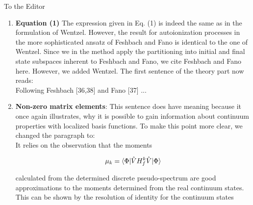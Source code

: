 \documentclass[DIN,pagenumber=false,parskip=half,fromalign=left,fromphone=true,fromemail=true,fromurl=false,fromlogo=false,fromrule=false]{scrlttr2}
\begin{document}
\begin{letter}{To the Editor}
\begin{enumerate}
\begin{enumerate}
{{         For krypton one other set of calculated decay widths is available in
         the literature [62]. These calculations are based on a
         many-body perturbation approach including all orders of perturbation.
         They state that these results are approximately 75\% of the values
         for calculations including   
         perturbations up to second order only. Therefore the second order numbers
         would agree well with our values obtained with the FanoADC-Stieltjes
         method shown       
         in Table I. However, all integrations in this procedure rely
         on analytic evaluation using angular momentum algebra and are hence not
         applicable to non-spherical systems.}}
   \item \textbf{Equation (1)}
         The expression given in Eq. (1) is indeed the same as in the formulation
         of Wentzel. However, the result for autoionization processes
         in the more sophisticated ansatz of Feshbach and Fano is identical
         to the one of Wentzel. Since we in the method apply the partitioning
         into initial and final state subspaces inherent to Feshbach and Fano,
         we cite Feshbach and Fano here. However, we added Wentzel.
         The first sentence of the theory part now reads:\\
         Following {\color{blue}{Wentzel [47] and later}} Feshbach [36,38]
         and Fano [37] ...
   \item \textbf{Non-zero matrix elements}:
         This sentence does have meaning because it once again illustrates, why
         it is possible to gain information about continuum properties with
         localized basis functions. To make this point more clear, we changed
         the paragraph to:\\
         It relies on the observation that the moments
         {\color{blue}{ of the projected final
         state Hamiltonian $H_f$}}
         
         \begin{equation}
          \mu_k = \braket{ \Phi | \hat{V} H^k_f \hat{V} | \Phi }          
         \end{equation}                                                   
                                                                          
         calculated from the determined
         discrete pseudo-spectrum are good approximations to the moments determined
         from the real continuum states.                                  
         This can be shown by {\color{blue}{inserting}} the resolution of identity for 
         the continuum states


\end{enumerate}
\end{enumerate}
\end{letter}
\end{document}
